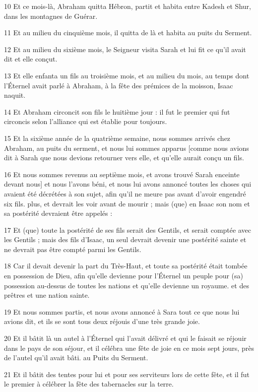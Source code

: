 \par 10 Et ce mois-là, Abraham quitta Hébron, partit et habita entre Kadesh et Shur, dans les montagnes de Guérar.
\par 11 Et au milieu du cinquième mois, il quitta de là et habita au puits du Serment.
\par 12 Et au milieu du sixième mois, le Seigneur visita Sarah et lui fit ce qu'il avait dit et elle conçut.
\par 13 Et elle enfanta un fils au troisième mois, et au milieu du mois, au temps dont l'Éternel avait parlé à Abraham, à la fête des prémices de la moisson, Isaac naquit.
\par 14 Et Abraham circoncit son fils le huitième jour : il fut le premier qui fut circoncis selon l'alliance qui est établie pour toujours.
\par 15 Et la sixième année de la quatrième semaine, nous sommes arrivés chez Abraham, au puits du serment, et nous lui sommes apparus [comme nous avions dit à Sarah que nous devions retourner vers elle, et qu'elle aurait conçu un fils.
\par 16 Et nous sommes revenus au septième mois, et avons trouvé Sarah enceinte devant nous] et nous l'avons béni, et nous lui avons annoncé toutes les choses qui avaient été décrétées à son sujet, afin qu'il ne meure pas avant d'avoir engendré six fils. plus, et devrait les voir avant de mourir ; mais (que) en Isaac son nom et sa postérité devraient être appelés :
\par 17 Et (que) toute la postérité de ses fils serait des Gentils, et serait comptée avec les Gentils ; mais des fils d'Isaac, un seul devrait devenir une postérité sainte et ne devrait pas être compté parmi les Gentils.
\par 18 Car il devait devenir la part du Très-Haut, et toute sa postérité était tombée en possession de Dieu, afin qu'elle devienne pour l'Éternel un peuple pour (sa) possession au-dessus de toutes les nations et qu'elle devienne un royaume. et des prêtres et une nation sainte.
\par 19 Et nous sommes partis, et nous avons annoncé à Sara tout ce que nous lui avions dit, et ils se sont tous deux réjouis d'une très grande joie.
\par 20 Et il bâtit là un autel à l'Éternel qui l'avait délivré et qui le faisait se réjouir dans le pays de son séjour, et il célébra une fête de joie en ce mois sept jours, près de l'autel qu'il avait bâti. au Puits du Serment.
\par 21 Et il bâtit des tentes pour lui et pour ses serviteurs lors de cette fête, et il fut le premier à célébrer la fête des tabernacles sur la terre.
